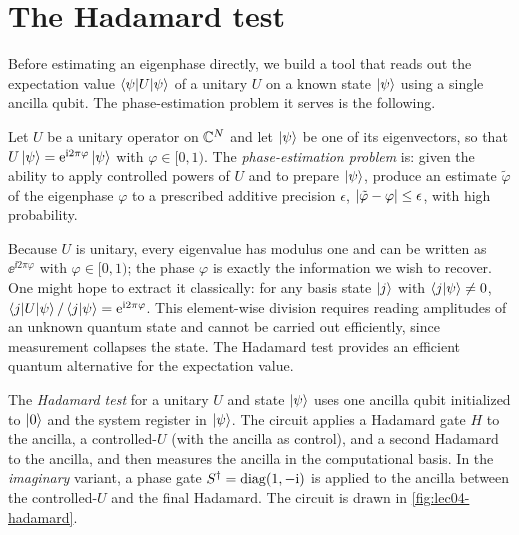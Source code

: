 \section{The Hadamard test}
\label{sec:lec04-1}

Before estimating an eigenphase directly, we build a tool that reads out the
expectation value $\braket{\psi|U|\psi}$ of a unitary $U$ on a known state
$\ket{\psi}$ using a single ancilla qubit. The phase-estimation problem it
serves is the following.

\begin{definition}
\label{def:lec04-pep}
Let $U$ be a unitary operator on $\mathbb{C}^{N}$ and let $\ket{\psi}$ be one of its
eigenvectors, so that $U\ket{\psi}=\mathrm{e}^{\mathrm{i} 2\pi\varphi}\ket{\psi}$ with
$\varphi\in[0,1)$. The \emph{phase-estimation problem} is: given the ability to
apply controlled powers of $U$ and to prepare $\ket{\psi}$, produce an estimate
$\tilde\varphi$ of the eigenphase $\varphi$ to a prescribed additive precision
$\epsilon$, $\left\lvert \tilde\varphi-\varphi \right\rvert\le\epsilon$, with high probability.
\end{definition}

Because $U$ is unitary, every eigenvalue has modulus one and can be written as
$\ee^{\ii 2\pi\varphi}$ with $\varphi\in[0,1)$; the phase $\varphi$ is exactly
the information we wish to recover. One might hope to extract it classically: for
any basis state $\ket{j}$ with $\braket{j|\psi}\neq0$,
$\braket{j|U|\psi}/\braket{j|\psi}=\mathrm{e}^{\mathrm{i} 2\pi\varphi}$. This element-wise
division requires reading amplitudes of an unknown quantum state and cannot be
carried out efficiently, since measurement collapses the state. The Hadamard
test provides an efficient quantum alternative for the expectation value.

\begin{definition}
\label{def:lec04-hadamard}
The \emph{Hadamard test} for a unitary $U$ and state $\ket{\psi}$ uses one
ancilla qubit initialized to $\ket{0}$ and the system register in $\ket{\psi}$.
The circuit applies a Hadamard gate $H$ to the ancilla, a controlled-$U$ (with
the ancilla as control), and a second Hadamard to the ancilla, and then measures
the ancilla in the computational basis. In the \emph{imaginary} variant, a phase
gate $S^{\dagger}=\operatorname{diag}(1,-\mathrm{i})$ is applied to the ancilla between the controlled-$U$
and the final Hadamard. The circuit is drawn in \cref{fig:lec04-hadamard}.
\end{definition}

